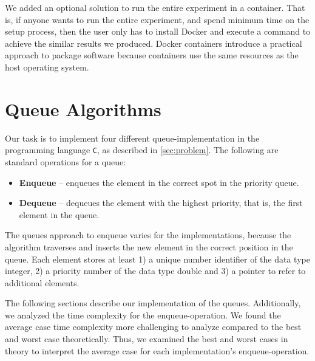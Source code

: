 \documentclass[a4paper,11pt]{kth-mag}
\newcommand*{\skippara}{\par\vspace{\baselineskip} \noindent}
\begin{document}
\skippara We added an optional solution to run the entire experiment in a container.
That is, if anyone wants to run the entire experiment, and spend minimum time on the setup process, then the user only has to install Docker and execute a command to achieve the similar results we produced.
Docker containers introduce a practical approach to package software because containers use the same resources as the host operating system.

\section{Queue Algorithms}\label{sec:algorithms}
Our task is to implement four different queue-implementation in the programming language \texttt{C}, as described in \cref{sec:problem}.
The following are standard operations for a queue:
\begin{itemize}
    \item \textbf{Enqueue} -- enqueues the element in the correct spot in the priority queue.
    \item \textbf{Dequeue} -- dequeues the element with the highest priority, that is, the first element in the queue.
\end{itemize}

\skippara The queues approach to enqueue varies for the implementations, because the algorithm traverses and inserts the new element in the correct position in the queue.
Each element stores at least 1) a unique number identifier of the data type integer, 2) a priority number of the data type double and 3) a pointer to refer to additional elements.

\skippara The following sections describe our implementation of the queues.
Additionally, we analyzed the time complexity for the enqueue-operation.
We found the average case time complexity more challenging to analyze compared to the best and worst case theoretically.
Thus, we examined the best and worst cases in theory to interpret the average case for each implementation's enqueue-operation.
\end{document}
